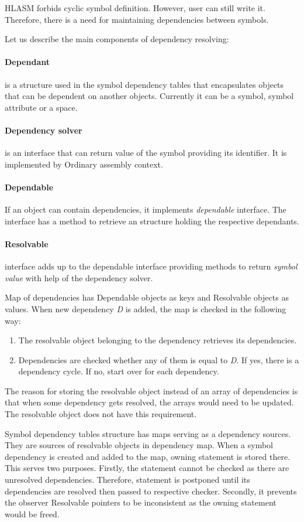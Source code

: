 HLASM forbids cyclic symbol definition. However, user can still write it. Therefore, there is a need for maintaining dependencies between symbols.

Let us describe the main components of dependency resolving:

\paragraph*{Dependant} is a structure used in the symbol dependency tables that encapsulates objects that can be dependent on another objects. Currently it can be a symbol, symbol attribute or a space.

\paragraph*{Dependency solver} is an interface that can return value of the symbol providing its identifier. It is implemented by Ordinary assembly context.

\paragraph*{Dependable} If an object can contain dependencies, it implements \emph{dependable} interface. The interface has a method to retrieve an structure holding the respective dependants. 

\paragraph*{Resolvable} interface adds up to the dependable interface providing methods to return \emph{symbol value} with help of the dependency solver.

\vspace{0.5cm}

Map of dependencies has Dependable objects as keys and Resolvable objects as values. When new dependency \emph{D} is added, the map is checked in the following way:
\begin{enumerate}
	\item The resolvable object belonging to the dependency retrieves its dependencies.
	\item Dependencies are checked whether any of them is equal to \emph{D}. If yes, there is a dependency cycle. If no, start over for each dependency. 
\end{enumerate}

The reason for storing the resolvable object instead of an array of dependencies is that when some dependency gets resolved, the arrays would need to be updated. The resolvable object does not have this requirement.

Symbol dependency tables structure has maps serving as a dependency sources. They are sources of resolvable objects in dependency map. When a symbol dependency is created and added to the map, owning statement is stored there. This serves two purposes. Firstly, the statement cannot be checked as there are unresolved dependencies. Therefore, statement is postponed until its dependencies are resolved then passed to respective checker. Secondly, it prevents the observer Resolvable pointers to be inconsistent as the owning statement would be freed.